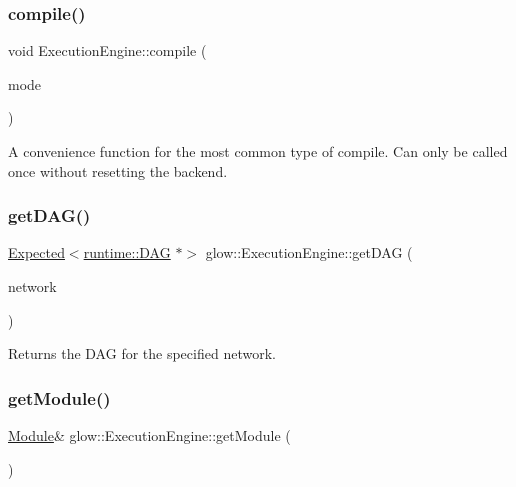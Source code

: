 \subsubsection{\texorpdfstring{compile()}{compile()}\hspace{0.1cm}{\footnotesize\ttfamily [2/2]}}
{\footnotesize\ttfamily void Execution\+Engine\+::compile (\begin{DoxyParamCaption}\item[{\hyperlink{structglow_1_1_compilation_context_a92efb87746c0edf7756b84fdcd87014a}{Compilation\+Mode}}]{mode }\end{DoxyParamCaption})}

A convenience function for the most common type of compile. Can only be called once without resetting the backend. \mbox{\label{classglow_1_1_execution_engine_a01943b9b5b551fe72e0bdb6e5ca84103}} 
\subsubsection{\texorpdfstring{get\+D\+A\+G()}{getDAG()}}
{\footnotesize\ttfamily \hyperlink{classglow_1_1detail_1_1_glow_expected}{Expected}$<$\hyperlink{structglow_1_1runtime_1_1_d_a_g}{runtime\+::\+D\+AG} $\ast$$>$ glow\+::\+Execution\+Engine\+::get\+D\+AG (\begin{DoxyParamCaption}\item[{llvm\+::\+String\+Ref}]{network }\end{DoxyParamCaption})\hspace{0.3cm}{\ttfamily [inline]}}

\begin{DoxyReturn}{Returns}
the D\+AG for the specified {\ttfamily network}. 
\end{DoxyReturn}
\mbox{\label{classglow_1_1_execution_engine_a3ba6de88789f0caaf7fd777f21462729}} 
\subsubsection{\texorpdfstring{get\+Module()}{getModule()}}
{\footnotesize\ttfamily \hyperlink{classglow_1_1_module}{Module}\& glow\+::\+Execution\+Engine\+::get\+Module (\begin{DoxyParamCaption}{ }\end{DoxyParamCaption})\hspace{0.3cm}{\ttfamily [inline]}}

